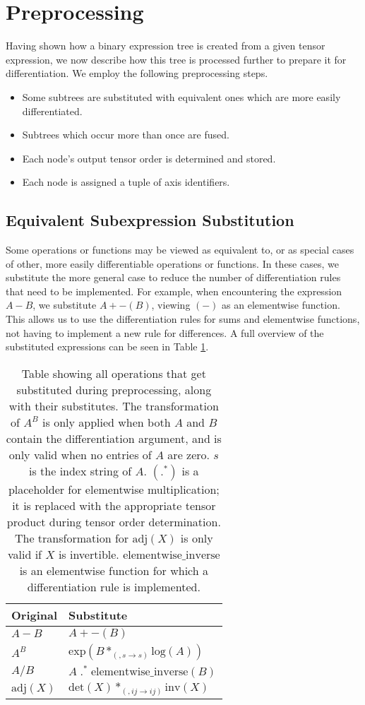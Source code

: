 \documentclass[12pt, a4paper]{report} %
\begin{document}
\FloatBarrier
\section{Preprocessing}
Having shown how a binary expression tree is created from a given tensor expression, we now describe how this tree is processed further to prepare it for differentiation.
We employ the following preprocessing steps.
\begin{itemize}
    \item Some subtrees are substituted with equivalent ones which are more easily differentiated.
    \item Subtrees which occur more than once are fused.
    \item Each node's output tensor order is determined and stored.
    \item Each node is assigned a tuple of axis identifiers.
\end{itemize}

\subsection{Equivalent Subexpression Substitution}
Some operations or functions may be viewed as equivalent to, or as special cases of other, more easily differentiable operations or functions.
In these cases, we substitute the more general case to reduce the number of differentiation rules that need to be implemented.
For example, when encountering the expression $A - B$, we substitute $A + -(B)$, viewing $(-)$ as an elementwise function.
This allows us to use the differentiation rules for sums and elementwise functions, not having to implement a new rule for differences.
A full overview of the substituted expressions can be seen in Table \ref{tab:substitutions}.
\begin{table}[ht]
    \centering
    \begin{tabular}{l | l}
        Original & Substitute \\\hline
        $A-B$ & $A + -(B)$ \\
        $A^B$ & $\text{exp}(B *_{(,s \rightarrow s)} \text{log}(A))$ \\
        $A/B$ & $A \;.^*\; \text{elementwise\_inverse}(B)$ \\
        $\text{adj}(X)$ & $\text{det}(X) *_{(,ij \rightarrow ij)} \text{inv}(X)$ \\ 
    \end{tabular}
    \caption[Subexpression Substitutions Applied During Preprocessing]{Table showing all operations that get substituted during preprocessing, along with their substitutes. The transformation of $A^B$ is only applied when both $A$ and $B$ contain the differentiation argument, and is only valid when no entries of $A$ are zero. $s$ is the index string of $A$. $(.^*)$ is a placeholder for elementwise multiplication; it is replaced with the appropriate tensor product during tensor order determination. The transformation for $\text{adj}(X)$ is only valid if $X$ is invertible. $\text{elementwise\_inverse}$ is an elementwise function for which a differentiation rule is implemented.}
    \label{tab:substitutions}
\end{table}
\FloatBarrier
\end{document}
